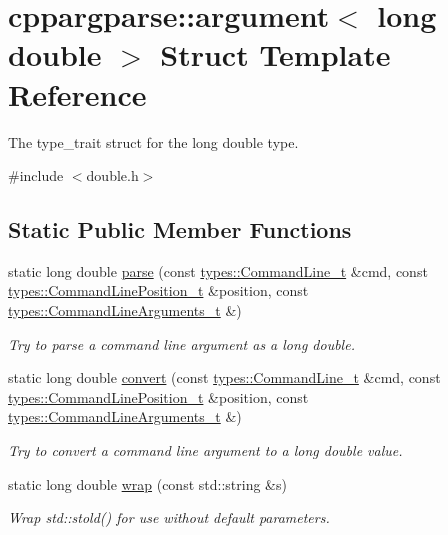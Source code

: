 \hypertarget{structcppargparse_1_1argument_3_01long_01double_01_4}{}\section{cppargparse\+:\+:argument$<$ long double $>$ Struct Template Reference}
\label{structcppargparse_1_1argument_3_01long_01double_01_4}


The type\+\_\+trait struct for the long double type.  




{\ttfamily \#include $<$double.\+h$>$}

\subsection*{Static Public Member Functions}
\begin{DoxyCompactItemize}
\item 
static long double \hyperlink{structcppargparse_1_1argument_3_01long_01double_01_4_ab14f735177594429fcc952fd6c7caf03}{parse} (const \hyperlink{types_8h_a80adf2418b7ce9fe616698efa7533ecf}{types\+::\+Command\+Line\+\_\+t} \&cmd, const \hyperlink{types_8h_a43b4f43f8940de1bf09ced6f1b668053}{types\+::\+Command\+Line\+Position\+\_\+t} \&position, const \hyperlink{types_8h_a003c660afe2ee9c6cc39aea966e8926d}{types\+::\+Command\+Line\+Arguments\+\_\+t} \&)
\begin{DoxyCompactList}\small\item\em Try to parse a command line argument as a long double. \end{DoxyCompactList}\item 
static long double \hyperlink{structcppargparse_1_1argument_3_01long_01double_01_4_a954e555300e80f577a4d9634cfe5054a}{convert} (const \hyperlink{types_8h_a80adf2418b7ce9fe616698efa7533ecf}{types\+::\+Command\+Line\+\_\+t} \&cmd, const \hyperlink{types_8h_a43b4f43f8940de1bf09ced6f1b668053}{types\+::\+Command\+Line\+Position\+\_\+t} \&position, const \hyperlink{types_8h_a003c660afe2ee9c6cc39aea966e8926d}{types\+::\+Command\+Line\+Arguments\+\_\+t} \&)
\begin{DoxyCompactList}\small\item\em Try to convert a command line argument to a long double value. \end{DoxyCompactList}\item 
static long double \hyperlink{structcppargparse_1_1argument_3_01long_01double_01_4_af5083247a7345ef5aa6dac17ab8d8378}{wrap} (const std\+::string \&s)
\begin{DoxyCompactList}\small\item\em Wrap std\+::stold() for use without default parameters. \end{DoxyCompactList}\end{DoxyCompactItemize}


